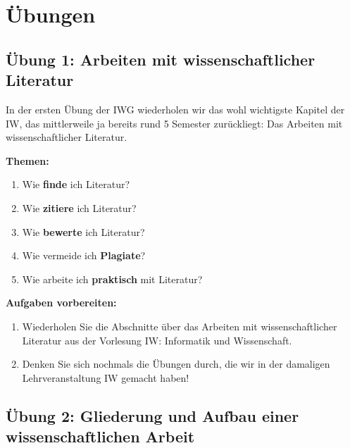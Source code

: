 \documentclass[a4paper]{article}%
\def\missing{MISSING TODO!!!!!!!!!!!!!!!!!!!!!!!!!!!!!!!!!!!!!!!!!!!!!!!!!!!!!!!!!}
\begin{document}
\clearpage
\section{Übungen}\label{Ubung}


\subsection{Übung 1: Arbeiten mit wissenschaftlicher Literatur}

In der ersten Übung der IWG wiederholen wir das wohl wichtigste Kapitel
der IW, das mittlerweile ja bereits rund 5 Semester zurückliegt: Das Arbeiten
mit wissenschaftlicher Literatur.

\textbf{Themen:}
\begin{enumerate}
\item Wie \textbf{finde} ich Literatur?
\item Wie \textbf{zitiere} ich Literatur?
\item Wie \textbf{bewerte} ich Literatur?
\item Wie vermeide ich \textbf{Plagiate}?
\item Wie arbeite ich \textbf{praktisch} mit Literatur?
\end{enumerate}

\bigskip

\textbf{Aufgaben vorbereiten:}
\begin{enumerate}
\item Wiederholen Sie die Abschnitte über das Arbeiten mit wissenschaftlicher Literatur aus der
Vorlesung IW: Informatik und Wissenschaft.
\item Denken Sie sich nochmals die Übungen durch, die wir in der damaligen Lehrveranstaltung
IW gemacht haben!
\end{enumerate}

\bigskip



\clearpage


\subsection{Übung 2: Gliederung und Aufbau einer wissenschaftlichen Arbeit}
\end{document}
